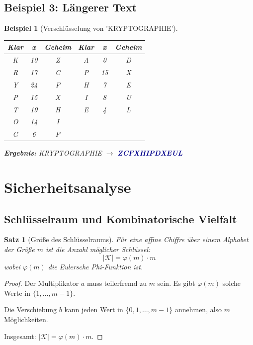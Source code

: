 ﻿\documentclass[12pt,a4paper]{article}
\newtheorem{theorem}{Satz}
\newtheorem{example}{Beispiel}
\begin{document}
	\subsection{Beispiel 3: Längerer Text}
	
	\begin{example}[Verschlüsselung von 'KRYPTOGRAPHIE']
		
		\begin{center}
			\begin{tabular}{c|c|c||c|c|c}
				\textbf{Klar} & \textbf{x} & \textbf{Geheim} & \textbf{Klar} & \textbf{x} & \textbf{Geheim} \\
				\hline
				K & 10 & Z & A & 0 & D \\
				R & 17 & C & P & 15 & X \\
				Y & 24 & F & H & 7 & E \\
				P & 15 & X & I & 8 & U \\
				T & 19 & H & E & 4 & L \\
				O & 14 & I & & & \\
				G & 6 & P & & & \\
			\end{tabular}
		\end{center}
		
		\textbf{Ergebnis:} KRYPTOGRAPHIE $\to$ \textcolor{darkblue}{\textbf{ZCFXHIPDXEUL}}
	\end{example}
	
	\section{Sicherheitsanalyse}
	
	\subsection{Schlüsselraum und Kombinatorische Vielfalt}
	
	\begin{theorem}[Größe des Schlüsselraums]
		Für eine affine Chiffre über einem Alphabet der Größe $m$ ist die Anzahl möglicher Schlüssel:
		\begin{equation}
			|\mathcal{K}| = \varphi(m) \cdot m
		\end{equation}
		wobei $\varphi(m)$ die Eulersche Phi-Funktion ist.
	\end{theorem}
	
	\begin{proof}
		Der Multiplikator $a$ muss teilerfremd zu $m$ sein. Es gibt $\varphi(m)$ solche Werte in 
		$\{1, \ldots, m-1\}$.
		
		Die Verschiebung $b$ kann jeden Wert in $\{0, 1, \ldots, m-1\}$ annehmen, also $m$ Möglichkeiten.
		
		Insgesamt: $|\mathcal{K}| = \varphi(m) \cdot m$.
	\end{proof}
	
\end{document}
